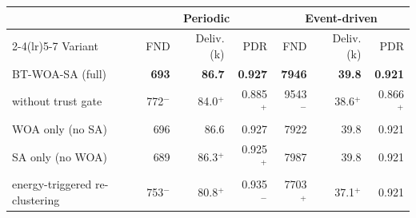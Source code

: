 \begin{tabular}{lrrrrrr}
\toprule
 & \multicolumn{3}{c}{Periodic} & \multicolumn{3}{c}{Event-driven} \\
\cmidrule(lr){2-4}\cmidrule(lr){5-7}
Variant & FND & Deliv. (k) & PDR & FND & Deliv. (k) & PDR \\
\midrule
BT-WOA-SA (full) & \textbf{693} & \textbf{86.7} & \textbf{0.927} & \textbf{7946} & \textbf{39.8} & \textbf{0.921} \\
without trust gate & 772$^{-}$ & 84.0$^{+}$ & 0.885$^{+}$ & 9543$^{-}$ & 38.6$^{+}$ & 0.866$^{+}$ \\
WOA only (no SA) & 696 & 86.6 & 0.927 & 7922 & 39.8 & 0.921 \\
SA only (no WOA) & 689 & 86.3$^{+}$ & 0.925$^{+}$ & 7987 & 39.8 & 0.921 \\
energy-triggered re-clustering & 753$^{-}$ & 80.8$^{+}$ & 0.935$^{-}$ & 7703$^{+}$ & 37.1$^{+}$ & 0.921 \\
\bottomrule
\end{tabular}
